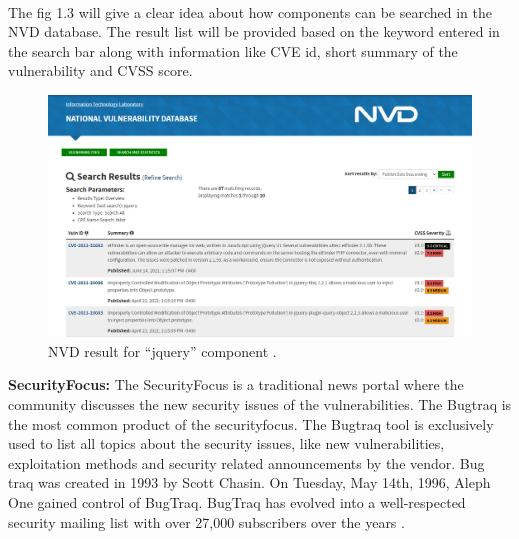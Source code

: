 \paragraph{}
The fig 1.3 will give a clear idea about how components can be searched in the \acs{NVD} database. The result list will be provided based on the keyword entered in the search bar along with information like \acs{CVE} id, short summary of the vulnerability and \acs{CVSS} score.
\newpage
\begin{figure}[h!]
	\includegraphics[width=15cm]{includes/nvd.png}
	\centering
	\caption{\acs{NVD} result for “jquery” component \cite{nist}.}
	\label{fig:nvd}
\end{figure}

{\bf SecurityFocus:} The SecurityFocus is a traditional news portal where the community discusses the new security issues of the vulnerabilities. The Bugtraq is the most common product of the securityfocus. The Bugtraq tool is exclusively used to list all topics about the security issues, like new vulnerabilities, exploitation methods and security related announcements by the vendor. Bug traq was created in 1993 by Scott Chasin. On Tuesday, May 14th, 1996, Aleph One gained control of BugTraq. BugTraq has evolved into a well-respected security mailing list with over 27,000 subscribers over the years \cite{BugTraq}.
